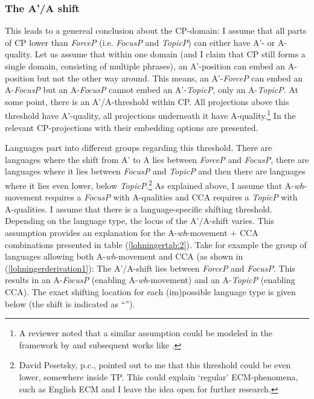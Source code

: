 \documentclass[output=paper,colorlinks,citecolor=brown]{langscibook}
\begin{document}
\subsubsection{The A'/A shift} 
This leads to a genereal conclusion about the CP-domain: I assume that all parts of CP lower than \emph{ForceP} (i.e. \emph{FocusP} and \emph{TopicP}) can either have A'- or A-quality. Let us assume that within one domain (and I claim that CP still forms a single domain, consisting of multiple phrases), an A'-position can embed an A-position but not the other way around.  This means, an A'-\emph{ForceP} can embed an A-\emph{FocusP} but an A-\emph{FocusP} cannot embed an A'-\emph{TopicP}, only an A-\emph{TopicP}. At some point, there is an A'/A-threshold within CP. All projections above this threshold have A'-quality, all projections underneath it have A-quality.\footnote{A reviewer noted that a similar assumption could be modeled in the framework by \citet{williams2002representation} and subsequent works like \citet{keine2018not}.} In  the relevant CP-projections with their embedding options are presented.

Languages part into different groups regarding this threshold. There are languages where the shift from A' to A lies between \emph{ForceP} and \emph{FocusP}, there are languages where it lies between \emph{FocusP} and \emph{TopicP} and then there are languages where it lies even lower, below \emph{TopicP}.\footnote{David Pesetsky, p.c., pointed out to me that this threshold could be even lower, somewhere inside TP. This could explain ‘regular' ECM-phenomena, such as English ECM and I leave the idea open for further research.} As explained above, I assume that A-\textit{wh}-movement requires a \emph{FocusP} with A-qualities and CCA requires a \emph{TopicP} with A-qualities. I assume that there is a language-specific shifting threshold. Depending on the language type, the locus of the A'/A-shift varies. This assumption provides an explanation for the A-\textit{wh}-movement + CCA combinations presented in table (\ref{lohningertab:2}). Take for example the group of languages allowing both A-\textit{wh}-movement and CCA (as shown in (\ref{lohningerderivation1}): The A'/A-shift lies between \emph{ForceP} and \emph{FocusP}. This results in an A-\emph{FocusP} (enabling A-\textit{wh}-movement) and an A-\emph{TopicP} (enabling CCA). The exact shifting location for each (im)possible language type is given below (the shift is indicated as “\rightarrow”).
\end{document}
